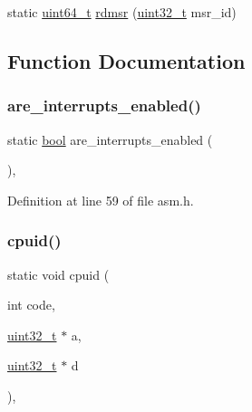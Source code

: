 \begin{DoxyCompactItemize}
\item 
static \hyperlink{a00038_aaa5d1cd013383c889537491c3cfd9aad_aaa5d1cd013383c889537491c3cfd9aad}{uint64\+\_\+t} \hyperlink{a00014_a6fa28502e33e305c4335fe3032dc7799_a6fa28502e33e305c4335fe3032dc7799}{rdmsr} (\hyperlink{a00038_a435d1572bf3f880d55459d9805097f62_a435d1572bf3f880d55459d9805097f62}{uint32\+\_\+t} msr\+\_\+id)
\end{DoxyCompactItemize}


\subsection{Function Documentation}
\mbox{\label{a00014_ae7df27a6150c6a020eead928af349b21_ae7df27a6150c6a020eead928af349b21}} 
\subsubsection{\texorpdfstring{are\+\_\+interrupts\+\_\+enabled()}{are\_interrupts\_enabled()}}
{\footnotesize\ttfamily static \hyperlink{a00038_af6a258d8f3ee5206d682d799316314b1_af6a258d8f3ee5206d682d799316314b1}{bool} are\+\_\+interrupts\+\_\+enabled (\begin{DoxyParamCaption}{ }\end{DoxyParamCaption})\hspace{0.3cm}{\ttfamily [inline]}, {\ttfamily [static]}}



Definition at line 59 of file asm.\+h.

\mbox{\label{a00014_adacb2a50c30267ac5314bfcb92ac1d85_adacb2a50c30267ac5314bfcb92ac1d85}} 
\subsubsection{\texorpdfstring{cpuid()}{cpuid()}}
{\footnotesize\ttfamily static void cpuid (\begin{DoxyParamCaption}\item[{int}]{code,  }\item[{\hyperlink{a00038_a435d1572bf3f880d55459d9805097f62_a435d1572bf3f880d55459d9805097f62}{uint32\+\_\+t} $\ast$}]{a,  }\item[{\hyperlink{a00038_a435d1572bf3f880d55459d9805097f62_a435d1572bf3f880d55459d9805097f62}{uint32\+\_\+t} $\ast$}]{d }\end{DoxyParamCaption})\hspace{0.3cm}{\ttfamily [inline]}, {\ttfamily [static]}}



